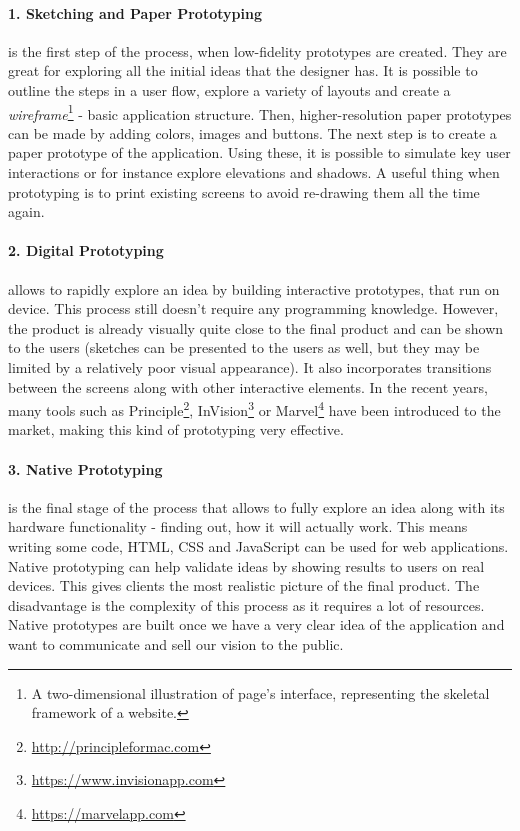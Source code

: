\paragraph{1. Sketching and Paper Prototyping} is the first step of the process, when low-fidelity prototypes are created. They are great for exploring all the initial ideas that the designer has. It is possible to outline the steps in a user flow, explore a variety of layouts and create a \textit{wireframe}\footnote{A two-dimensional illustration of page’s interface, representing the skeletal framework of a website.} - basic application structure. Then, higher-resolution paper prototypes can be made by adding colors, images and buttons.
The next step is to create a paper prototype of the application. Using these, it is possible to simulate key user interactions or for instance explore elevations and shadows. A useful thing when prototyping is to print existing screens to avoid re-drawing them all the time again.

\paragraph{2. Digital Prototyping} allows to rapidly explore an idea by building interactive prototypes, that run on device. This process still doesn’t require any programming knowledge. However, the product is already visually quite close to the final product and can be shown to the users (sketches can be presented to the users as well, but they may be limited by a relatively poor visual appearance). It also incorporates transitions between the screens along with other interactive elements. In the recent years, many tools such as Principle\footnote{\url{http://principleformac.com}}, InVision\footnote{\url{https://www.invisionapp.com}} or Marvel\footnote{\url{https://marvelapp.com}} have been introduced to the market, making this kind of prototyping very effective. 

\paragraph{3. Native Prototyping} is the final stage of the process that allows to fully explore an idea along with its hardware functionality - finding out, how it will actually work. This means writing some code, HTML, CSS and JavaScript can be used for web applications. Native prototyping can help validate ideas by showing results to users on real devices. This gives clients the most realistic picture of the final product. The disadvantage is the complexity of this process as it requires a lot of resources. Native prototypes are built once we have a very clear idea of the application and want to communicate and sell our vision to the public.


